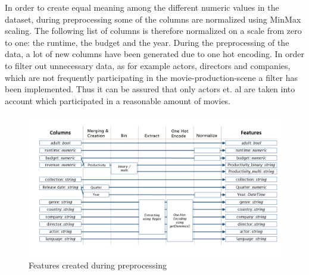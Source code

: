 In order to create equal meaning among the different numeric values in the dataset, during preprocessing some of the columns are normalized using MinMax scaling. The following list of columns is therefore normalized on a scale from zero to one: the runtime, the budget and the year.
During the preprocessing of the data, a lot of new columns have been generated due to one hot encoding. In order to filter out unnecessary data, as for example actors, directors and companies, which are not frequently participating in the movie-production-scene a filter has been implemented. Thus it can be assured that only actors et. al are taken into account which participated in a reasonable amount of movies.

\begin{figure}[htbp]
	\includegraphics[width=\textwidth]{images/3_features.png}
	\caption{Features created during preprocessing}
	\label{img:features}
\end{figure}
\FloatBarrier


